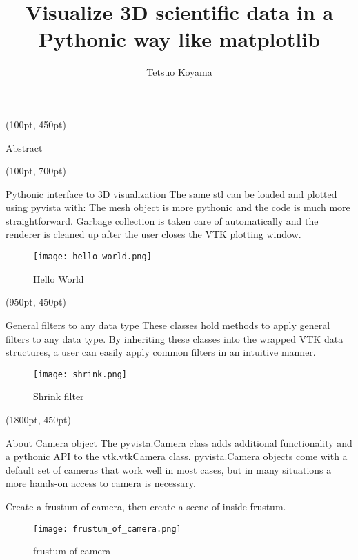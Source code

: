 \documentclass[final]{beamer}
\title{Visualize 3D scientific data in a Pythonic way like matplotlib} %
\author{Tetsuo Koyama} %
\institute{PyVista developers team} %
\begin{document}

\setlength{\belowcaptionskip}{2ex} %
\setlength\belowdisplayshortskip{2ex} %

\begin{textblock*}{800pt}(100pt, 450pt)
\begin{alertblock}{Abstract}
\end{alertblock}
\end{textblock*}

\begin{textblock*}{800pt}(100pt, 700pt)
\begin{block}{Pythonic interface to 3D visualization}
The same stl can be loaded and plotted using pyvista with:
The mesh object is more pythonic and the code is much more straightforward.
Garbage collection is taken care of automatically and the renderer is cleaned up after the user closes the VTK plotting window.
\begin{figure}
\texttt{[image: hello\_world.png]}
\caption{Hello World}
\end{figure}
\end{block}
\end{textblock*}

\begin{textblock*}{800pt}(950pt, 450pt)
\begin{block}{General filters to any data type}
These classes hold methods to apply general filters to any data type.
By inheriting these classes into the wrapped VTK data structures, a user can easily apply common filters in an intuitive manner.
\begin{figure}
\texttt{[image: shrink.png]}
\caption{Shrink filter}
\end{figure}
\end{block}
\end{textblock*}

\begin{textblock*}{800pt}(1800pt, 450pt)
\begin{block}{About Camera object}
The pyvista.Camera class adds additional functionality and a pythonic API to the vtk.vtkCamera class.
pyvista.Camera objects come with a default set of cameras that work well in most cases,
but in many situations a more hands-on access to camera is necessary.

Create a frustum of camera, then create a scene of inside frustum.

\begin{figure}
\texttt{[image: frustum\_of\_camera.png]}
\caption{frustum of camera}
\end{figure}
\end{block}
\end{textblock*}
\end{document}
